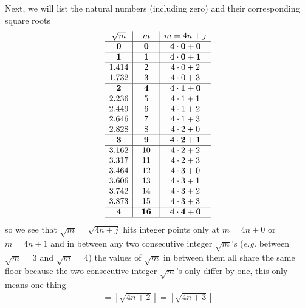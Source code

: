 \documentclass[aps,preprint,preprintnumbers,nofootinbib,showpacs,prd]{revtex4-1}
\newcommand{\eg}{{\it e.g.} }
\newcommand{\nbea}{\begin{eqnarray*}}
\newcommand{\neea}{\end{eqnarray*}}
\begin{document}
Next, we will list  the natural numbers (including zero) and their corresponding square roots
%
\nbea
\begin{array}{c|c|c}
\sqrt{m} & ~~m~~ & m = 4n + j\\ \hline
{\bf 0} & {\bf 0} & {\bf 4\cdot0 + 0} \\ \hline
{\bf 1} & {\bf 1} & {\bf 4\cdot0 + 1} \\ \hline
1.414 & 2 & 4\cdot0 + 2 \\
1.732 & 3 & 4\cdot0 + 3 \\ \hline
{\bf 2} & {\bf 4} & {\bf 4\cdot1 + 0} \\ \hline
2.236 & 5 & 4\cdot1 + 1 \\
2.449 & 6 & 4\cdot1 + 2 \\
2.646 & 7 & 4\cdot1 + 3 \\
2.828 & 8 & 4\cdot2 + 0 \\ \hline
{\bf 3} & {\bf 9} & {\bf 4\cdot2 + 1} \\ \hline
3.162 & 10 & 4\cdot2 + 2 \\
3.317 & 11 & 4\cdot2 + 3 \\
3.464 & 12 & 4\cdot3 + 0 \\
3.606 & 13 & 4\cdot3 + 1 \\           
3.742 & 14 & 4\cdot3 + 2 \\           
3.873 & 15 & 4\cdot3 + 3 \\ \hline           
{\bf 4} & {\bf 16} & {\bf 4\cdot4 + 0} \\ \hline          
\end{array}
\neea
%
so we see that $\sqrt{m} = \sqrt{4n+j}$ hits integer points only at $m=4n+0$ or $m=4n+1$ and in between any two consecutive integer $\sqrt{m}$'s (\eg between $\sqrt{m} = 3$ and $\sqrt{m} = 4$) the values of $\sqrt{m}$ in between them all share the same floor because the two consecutive integer $\sqrt{m}$'s only differ by one, this only means one thing
%
\nbea
[\sqrt{4n+1}] = [\sqrt{4n+2}] = [\sqrt{4n+3}]
\neea
%
\end{document}
